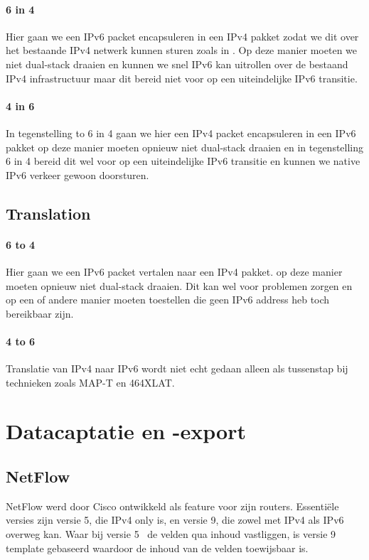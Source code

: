 \paragraph{6 in 4}
Hier gaan we een IPv6 packet encapsuleren in een IPv4 pakket zodat we dit over het bestaande IPv4 netwerk kunnen sturen zoals in \textcite{Gilligan2005}. Op deze manier moeten we niet dual-stack draaien en kunnen we snel IPv6 kan uitrollen over de bestaand IPv4 infrastructuur maar dit bereid niet voor op een uiteindelijke IPv6 transitie.


\paragraph{4 in 6}
In tegenstelling to 6 in 4 gaan  we hier een IPv4 packet encapsuleren in een IPv6 pakket op deze manier moeten opnieuw niet dual-stack draaien en in tegenstelling 6 in 4 bereid dit wel voor op een uiteindelijke IPv6 transitie en kunnen we native IPv6 verkeer gewoon doorsturen.


\subsection{Translation}
\paragraph{6 to 4}
Hier gaan we een IPv6 packet vertalen naar een IPv4 pakket. op deze manier moeten opnieuw niet dual-stack draaien. Dit kan wel voor problemen zorgen en op een of andere manier moeten toestellen die geen IPv6 address heb toch bereikbaar zijn.

\paragraph{4 to 6}
Translatie van IPv4 naar IPv6 wordt niet echt gedaan alleen als tussenstap bij technieken zoals MAP-T en 464XLAT.

\section{Datacaptatie en -export}
\subsection{NetFlow}
NetFlow werd door Cisco ontwikkeld als feature voor zijn routers. Essentiële versies zijn versie 5, die IPv4 only is, en versie 9, die zowel met IPv4 als IPv6 overweg kan. Waar bij versie 5~\autocite{Cisco2007} de velden qua inhoud vastliggen, is versie 9~\autocite{Claise2004} template gebaseerd waardoor de inhoud van de velden toewijsbaar is.

